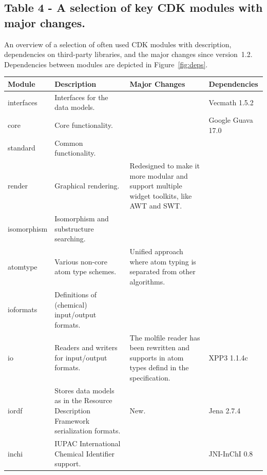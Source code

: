 \documentclass[10pt]{bmcart}
\begin{document}
\begin{backmatter}
\newpage
    
      \subsection*{Table 4 - A selection of key CDK modules with major changes.}\label{tab:modules}
  An overview of a selection of often used CDK modules with description,
  dependencies on third-party libraries, and the major changes since
  version~1.2. Dependencies between modules are depicted in Figure~\ref{fig:deps}.
  \baselineskip

    \begin{minipage}{1\textwidth}
    \renewcommand*{\thempfootnote}{\fnsymbol{mpfootnote}}
    \centering
    \begin{tabular}{lp{3cm}p{3cm}l}
  \textbf{Module}            & \textbf{Description}  & \textbf{Major Changes} & \textbf{Dependencies} \\ \hline
  interfaces                 & Interfaces for the data models. & & Vecmath 1.5.2 \\ \hline
  core                       & Core functionality.             & & Google Guava 17.0 \\ \hline %
  standard                   & Common functionality.           & & \\ \hline
  render                     & Graphical rendering.            & Redesigned to make it more modular and support multiple widget toolkits, like AWT and SWT. & \\ \hline
  isomorphism                & Isomorphism and substructure searching. & & \\ \hline
  atomtype                   & Various non-core atom type schemes.     & Unified approach where atom typing is separated from other algorithms. & \\ \hline
  ioformats                  & Definitions of (chemical) input/output formats. & & \\ \hline
  io                         & Readers and writers for input/output formats.  & The molfile reader has been rewritten and supports in atom types defind in the specification. & XPP3 1.1.4c \\ \hline
  iordf                      & Stores data models as in the Resource Description Framework serialization formats. & New. & Jena 2.7.4 \\ \hline
  inchi                      & IUPAC International Chemical Identifier support. & & JNI-InChI 0.8~\cite{Spjuth2013}  \\ \hline

\end{tabular}
\end{minipage}
\end{backmatter}
\end{document}
